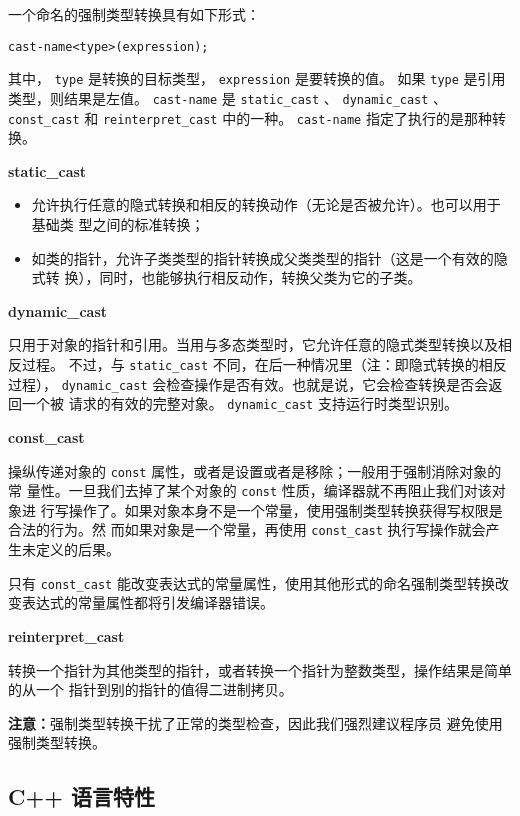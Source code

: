 一个命名的强制类型转换具有如下形式：

\verb|cast-name<type>(expression);|

\noindent 其中， \verb|type| 是转换的目标类型， \verb|expression| 是要转换的值。
如果 \verb|type| 是引用类型，则结果是左值。 \verb|cast-name| 是 \verb|static_cast| 、
\verb|dynamic_cast| 、 \verb|const_cast| 和 \verb|reinterpret_cast| 中的一种。
\verb|cast-name| 指定了执行的是那种转换。

\noindent\textbf{static\_cast}

\begin{itemize}
\item 允许执行任意的隐式转换和相反的转换动作（无论是否被允许）。也可以用于基础类
  型之间的标准转换；
\item 如类的指针，允许子类类型的指针转换成父类类型的指针（这是一个有效的隐式转
  换），同时，也能够执行相反动作，转换父类为它的子类。
\end{itemize}

\noindent\textbf{dynamic\_cast}

只用于对象的指针和引用。当用与多态类型时，它允许任意的隐式类型转换以及相反过程。
不过，与 \verb|static_cast| 不同，在后一种情况里（注：即隐式转换的相反过程），
\verb|dynamic_cast| 会检查操作是否有效。也就是说，它会检查转换是否会返回一个被
请求的有效的完整对象。 \verb|dynamic_cast| 支持运行时类型识别。 

\noindent\textbf{const\_cast}

操纵传递对象的 \verb|const| 属性，或者是设置或者是移除；一般用于强制消除对象的常
量性。一旦我们去掉了某个对象的 \verb|const| 性质，编译器就不再阻止我们对该对象进
行写操作了。如果对象本身不是一个常量，使用强制类型转换获得写权限是合法的行为。然
而如果对象是一个常量，再使用 \verb|const_cast| 执行写操作就会产生未定义的后果。

只有 \verb|const_cast| 能改变表达式的常量属性，使用其他形式的命名强制类型转换改
变表达式的常量属性都将引发编译器错误。

\noindent\textbf{reinterpret\_cast}

转换一个指针为其他类型的指针，或者转换一个指针为整数类型，操作结果是简单的从一个
指针到别的指针的值得二进制拷贝。

\noindent\textbf{注意：}强制类型转换干扰了正常的类型检查，因此我们强烈建议程序员
避免使用强制类型转换。

\subsection{C++ 语言特性}

